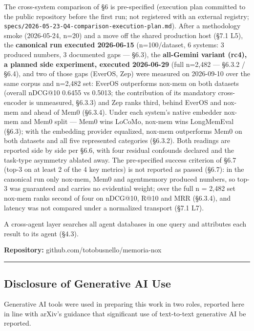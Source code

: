 \documentclass[
]{article}
\begin{document}
The cross-system comparison of §6 is pre-specified (execution plan
committed to the public repository before the first run; not registered
with an external registry;
\texttt{specs/2026-05-23-Q4-comparison-execution-plan.md}). After a
methodology smoke (2026-05-24, n=20) and a move off the shared
production host (§7.1 L5), the \textbf{canonical run executed
2026-06-15} (n=100/dataset, 6 systems: 3 produced numbers, 3 documented
gaps --- §6.3), the \textbf{all-Gemini variant (rc4), a planned side
experiment, executed 2026-06-29} (full n=2,482 --- §6.3.2 / §6.4), and
two of those gaps (EverOS, Zep) were measured on 2026-09-10 over the
same corpus and n=2,482 set: EverOS outperforms nox-mem on both datasets
(overall nDCG@10 0.6455 vs 0.5013; the contribution of its mandatory
cross-encoder is unmeasured, §6.3.3) and Zep ranks third, behind EverOS
and nox-mem and ahead of Mem0 (§6.3.4). Under each system's native
embedder nox-mem and Mem0 split --- Mem0 wins LoCoMo, nox-mem wins
LongMemEval (§6.3); with the embedding provider equalized, nox-mem
outperforms Mem0 on both datasets and all five represented categories
(§6.3.2). Both readings are reported side by side per §6.6, with four
residual confounds declared and the task-type asymmetry ablated away.
The pre-specified success criterion of §6.7 (top-3 on at least 2 of the
4 key metrics) is not reported as passed (§6.7): in the canonical run
only nox-mem, Mem0 and agentmemory produced numbers, so top-3 was
guaranteed and carries no evidential weight; over the full n = 2,482 set
nox-mem ranks second of four on nDCG@10, R@10 and MRR (§6.3.4), and
latency was not compared under a normalized transport (§7.1 L7).

A cross-agent layer searches all agent databases in one query and
attributes each result to its agent (§4.3).

\textbf{Repository:} github.com/totobusnello/memoria-nox

\begin{center}\rule{0.5\linewidth}{0.5pt}\end{center}

\subsection{Disclosure of Generative AI
Use}\label{disclosure-of-generative-ai-use}

Generative AI tools were used in preparing this work in two roles,
reported here in line with arXiv's guidance that significant use of
text-to-text generative AI be reported.
\end{document}
